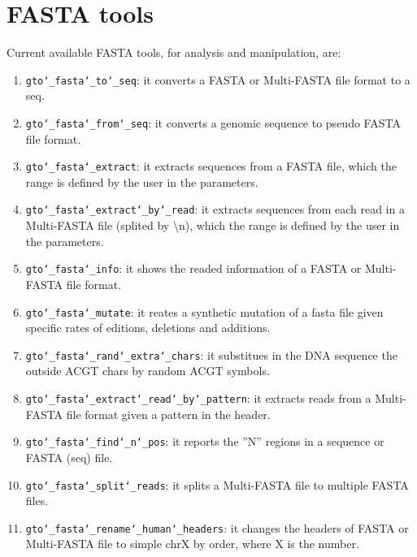 \chapter{FASTA tools}
\label{fasta}

Current available FASTA tools, for analysis and manipulation, are:
\begin{enumerate}

\item \texttt{gto\char`_fasta\char`_to\char`_seq}: it converts a FASTA or Multi-FASTA file format to a seq.

\item \texttt{gto\char`_fasta\char`_from\char`_seq}: it converts a genomic sequence to pseudo FASTA file format.

\item \texttt{gto\char`_fasta\char`_extract}: it extracts sequences from a FASTA file, which the range is defined by the user in the parameters.

\item \texttt{gto\char`_fasta\char`_extract\char`_by\char`_read}: it extracts sequences from each read in a Multi-FASTA file (splited by \textbackslash n), which the range is defined by the user in the parameters.

\item \texttt{gto\char`_fasta\char`_info}: it shows the readed information of a FASTA or Multi-FASTA file format.

\item \texttt{gto\char`_fasta\char`_mutate}: it reates a synthetic mutation of a fasta file given specific rates of editions, deletions and additions.

\item \texttt{gto\char`_fasta\char`_rand\char`_extra\char`_chars}: it substitues in the DNA sequence the outside ACGT chars by random ACGT symbols.

\item \texttt{gto\char`_fasta\char`_extract\char`_read\char`_by\char`_pattern}: it extracts reads from a Multi-FASTA file format given a pattern in the header.

\item \texttt{gto\char`_fasta\char`_find\char`_n\char`_pos}: it reports the ''N'' regions in a sequence or FASTA (seq) file.

\item \texttt{gto\char`_fasta\char`_split\char`_reads}: it splits a Multi-FASTA file to multiple FASTA files.

\item \texttt{gto\char`_fasta\char`_rename\char`_human\char`_headers}: it changes the headers of FASTA or Multi-FASTA file to simple chrX by order, where X is the number.

\end{enumerate}


